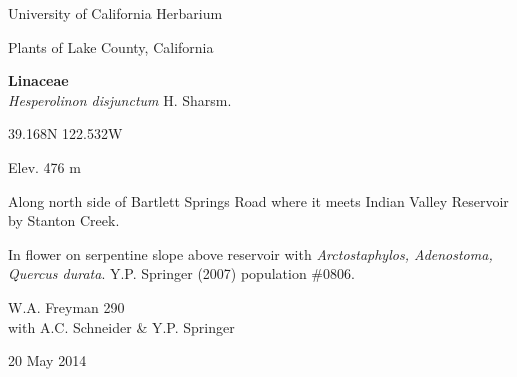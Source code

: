 \documentclass[letterpaper,10pt]{article}
\begin{document}
\begin{minipage}[t]{0.40\textwidth}

\begin{center}
University of California Herbarium \\
\begin{large}
Plants of Lake County, California \\
\end{large}
\vspace{\baselineskip}
\textbf{Linaceae} \\
\textit{Hesperolinon disjunctum} H. Sharsm.\\
\end{center}

\begin{footnotesize}

\begin{multicols}{2}
39.168\textdegree N 122.532\textdegree W
\columnbreak
\begin{flushright}
Elev. 476 m
\end{flushright}
\end{multicols}

Along north side of Bartlett Springs Road where it meets Indian Valley Reservoir by Stanton Creek.
\vspace{\baselineskip}

In flower on serpentine slope above reservoir with \textit{Arctostaphylos, Adenostoma, Quercus durata}. Y.P. Springer (2007) population \#0806.

\begin{multicols}{2}
W.A. Freyman 290 \\
with A.C. Schneider \& Y.P. Springer
\columnbreak
\begin{flushright}
20 May 2014
\end{flushright}
\end{multicols}

\end{footnotesize}

\end{minipage}
%
\hspace{2cm}
%
\end{document}
